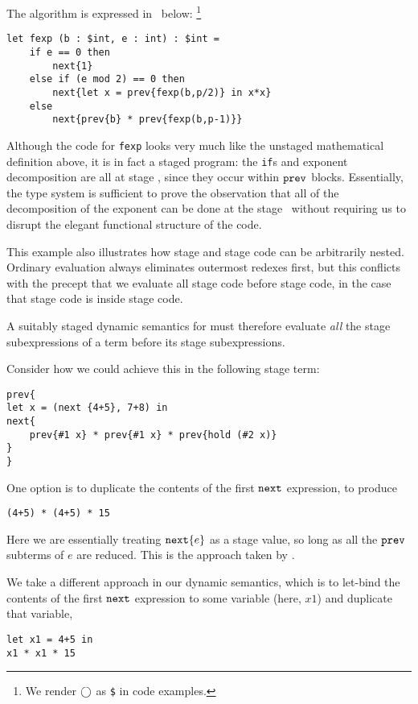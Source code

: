 \noindent
The algorithm is expressed in \lang\ below:%
\footnote{We render $\bigcirc$ as {\tt \$} in code examples.}

\begin{lstlisting} 
let fexp (b : $int, e : int) : $int =
	if e == 0 then
		next{1}
	else if (e mod 2) == 0 then
		next{let x = prev{fexp(b,p/2)} in x*x}
	else
		next{prev{b} * prev{fexp(b,p-1)}}		
\end{lstlisting}

Although the code for {\tt fexp} looks very much like the unstaged mathematical
definition above, it is in fact a staged program: the {\tt if}s and exponent
decomposition are all at stage \bbone, since they occur within ${\tt prev}$ blocks.
Essentially, the type system is sufficient to prove the observation that all of
the decomposition of the exponent can be done at the stage \bbone~without
requiring us to disrupt the elegant functional structure of the code.

This example also illustrates how stage \bbone{} and stage \bbtwo{} code can be
arbitrarily nested.  Ordinary evaluation always eliminates outermost redexes
first, but this conflicts with the precept that we evaluate all stage \bbone{}
code before stage \bbtwo{} code, in the case that stage \bbone{} code is inside
stage \bbtwo{} code.

A suitably staged dynamic semantics for \lang{} must therefore evaluate
\emph{all} the stage \bbone{} subexpressions of a term before its stage
\bbtwo{} subexpressions.

Consider how we could achieve this in the following stage \bbtwo{} term:
\begin{lstlisting} 
prev{
let x = (next {4+5}, 7+8) in
next{
	prev{#1 x} * prev{#1 x} * prev{hold (#2 x)}
}
}
\end{lstlisting}
One option is to duplicate the contents of the first ${\tt next}$ expression, to produce
\begin{lstlisting}
(4+5) * (4+5) * 15
\end{lstlisting}

Here we are essentially treating ${\tt next}\{e\}$ as a stage \bbone{} value, so long
as all the ${\tt prev}$ subterms of $e$ are reduced. This is the approach taken by
\cite{davies96}.

We take a different approach in our dynamic semantics, which is to let-bind the
contents of the first ${\tt next}$ expression to some variable (here, $x1$) and
duplicate that variable,
\begin{lstlisting} 
let x1 = 4+5 in
x1 * x1 * 15
\end{lstlisting}

